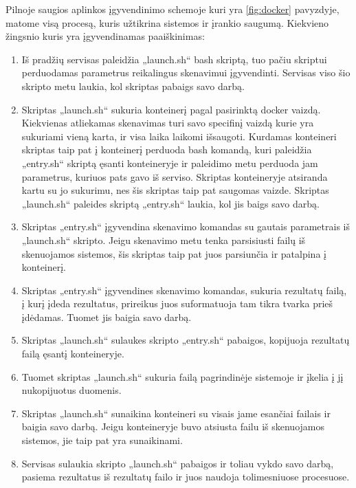 \documentclass[a4paper,12pt,fleqn]{article}
\begin{document}
Pilnoje saugios aplinkos įgyvendinimo schemoje kuri yra \ref{fig:docker} pavyzdyje, matome visą procesą, kuris užtikrina sistemos ir įrankio saugumą. Kiekvieno žingsnio kuris yra įgyvendinamas paaiškinimas:
\begin{enumerate}
	\item Iš pradžių servisas paleidžia „launch.sh“ bash skriptą, tuo pačiu skriptui perduodamas parametrus reikalingus skenavimui įgyvendinti. Servisas viso šio skripto metu laukia, kol skriptas pabaigs savo darbą.
	
	\item Skriptas „launch.sh“ sukuria konteinerį pagal pasirinktą docker vaizdą. Kiekvienas atliekamas skenavimas turi savo specifinį vaizdą kurie yra sukuriami vieną karta, ir visa laika laikomi išsaugoti.
	Kurdamas konteineri skriptas taip pat į konteinerį perduoda bash komandą, kuri paleidžia „entry.sh“ skriptą ęsanti konteineryje ir paleidimo metu perduoda jam parametrus, kuriuos pats gavo iš serviso. Skriptas konteineryje atsiranda kartu su jo sukurimu, nes šis skriptas taip pat saugomas vaizde. Skriptas „launch.sh“ paleides skriptą „entry.sh“ laukia, kol jis baigs savo darbą.
	
	\item Skriptas „entry.sh“ įgyvendina skenavimo komandas su gautais parametrais iš „launch.sh“ skripto. Jeigu skenavimo metu tenka parsisiusti failų iš skenuojamos sistemos, šis skriptas taip pat juos parsiunčia ir patalpina į konteinerį. 
	
	\item Skriptas „entry.sh“ įgyvendines skenavimo komandas, sukuria rezultatų failą, į kurį įdeda rezultatus, prireikus juos suformatuoja tam tikra tvarka prieš įdėdamas. Tuomet jis baigia savo darbą.
	
	\item Skriptas „launch.sh“ sulaukes skripto „entry.sh“ pabaigos, kopijuoja rezultatų failą ęsantį konteineryje.
	
	\item Tuomet skriptas „launch.sh“ sukuria failą pagrindinėje sistemoje ir įkelia į jį nukopijuotus duomenis.
	
	\item Skriptas „launch.sh“ sunaikina konteineri su visais jame esančiai failais ir baigia savo darbą. Jeigu konteineryje buvo atsiusta failu iš skenuojamos sistemos, jie taip pat yra sunaikinami.
	
	\item Servisas sulaukia skripto „launch.sh“ pabaigos ir toliau vykdo savo darbą, pasiema rezultatus iš rezultatų failo ir juos naudoja tolimesniuose procesuose.
\end{enumerate} 
\end{document}
